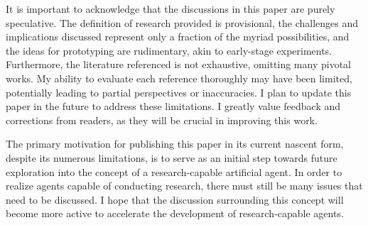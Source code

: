 \documentclass{article}
\begin{document}
It is important to acknowledge that the discussions in this paper are purely speculative. The definition of research provided is provisional, the challenges and implications discussed represent only a fraction of the myriad possibilities, and the ideas for prototyping are rudimentary, akin to early-stage experiments. Furthermore, the literature referenced is not exhaustive, omitting many pivotal works. My ability to evaluate each reference thoroughly may have been limited, potentially leading to partial perspectives or inaccuracies. I plan to update this paper in the future to address these limitations. I greatly value feedback and corrections from readers, as they will be crucial in improving this work.

The primary motivation for publishing this paper in its current nascent form, despite its  numerous limitations, is to serve as an initial step towards future exploration into the concept of a research-capable artificial agent. In order to realize agents capable of conducting research, there must still be many issues that need to be discussed. I hope that the discussion surrounding this concept will become more active to accelerate the development of research-capable agents.



\end{document}

